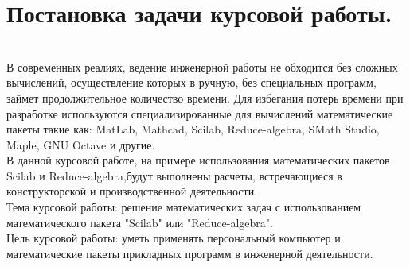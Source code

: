 \documentclass[russian, utf8, nocolumnxxxi, nocolumnxxxii, 14pt]{eskdtext}
\begin{document}
\maketitle
\newpage
\tableofcontents
\newpage
\section{Постановка задачи курсовой работы.} \\
\indent В современных реалиях, ведение инженерной работы не обходится без сложных вычислений, осуществление которых в ручную, без специальных программ, займет продолжительное количество времени. Для избегания потерь времени при разработке используются специализированные для вычислений математические пакеты такие как: MatLab, Mathcad, Scilab, Reduce-algebra, SMath Studio, Maple, GNU Octave и другие.\\
\indent В данной курсовой работе, на примере использования математических пакетов Scilab и Reduce-algebra,будут выполнены расчеты, встречающиеся в конструкторской и производственной деятельности.\\
\indent Тема курсовой работы: решение математических задач с использованием математического пакета "Scilab" или "Reduce-algebra".\\
\indent Цель курсовой работы: уметь применять персональный компьютер и
математические пакеты прикладных программ в инженерной деятельности.\\
\newpage
\end{document}
